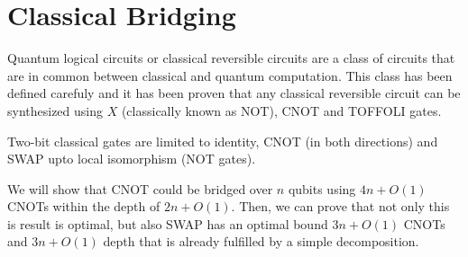 \documentclass{report}
\begin{document}

\section{Classical Bridging}\label{sec:classical_bridging}

Quantum logical circuits or classical reversible circuits are a class of circuits that are in common between classical and quantum computation. This class has been defined carefuly \cite{shende2003} and it has been proven that any classical reversible circuit can be synthesized using $X$ (classically known as NOT), CNOT and TOFFOLI gates.

Two-bit classical gates are limited to identity, CNOT (in both directions) and SWAP upto local isomorphism (NOT gates).

We will show that CNOT could be bridged over $n$ qubits using $4n + O(1)$ CNOTs within the depth of $2n + O(1)$. Then, we can prove that not only this is result is optimal, but also SWAP has an optimal bound $3n + O(1)$ CNOTs and $3n + O(1)$ depth that is already fulfilled by a simple decomposition.
\end{document}
